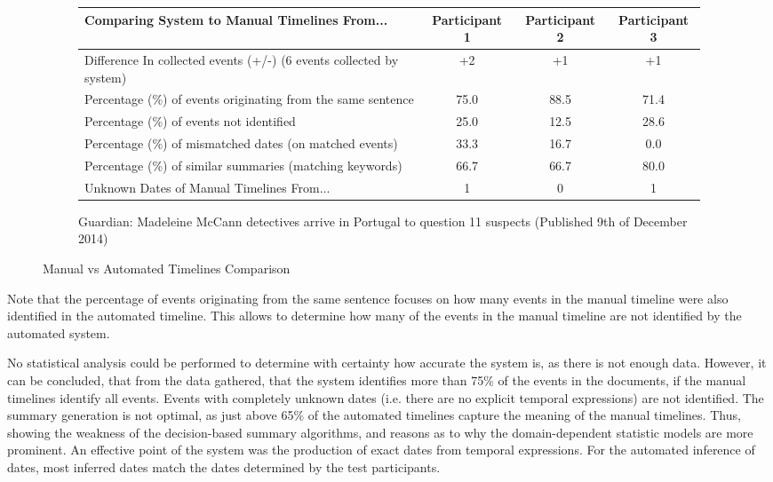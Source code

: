 \begin{figure}[h]
\begin{subfigure}{.5\textwidth}
\begin{tabular}{ |p{5cm}|c|c|c| } 
 \hline
Comparing System to Manual Timelines From... & Participant 1 & Participant 2 & Participant 3\\
\hline
\hline
Difference In collected events (+/-) (6 events collected by system) &  +2 & +1 & +1 \\
\hline
Percentage (\%) of events originating from the same sentence  & 75.0 & 88.5 & 71.4\\
\hline
Percentage (\%) of events not identified & 25.0 & 12.5 & 28.6\\
\hline
Percentage (\%) of mismatched dates (on matched events) & 33.3 & 16.7 & 0.0\\
\hline
Percentage (\%) of similar summaries (matching keywords) & 66.7 & 66.7 & 80.0\\
\hline
Unknown Dates of Manual Timelines From... & 1 & 0 & 1\\
\hline
\end{tabular}
\caption{Guardian: Madeleine McCann detectives arrive in Portugal to question 11 suspects (Published 9th of December 2014)}
\end{subfigure}

\caption{Manual vs Automated Timelines Comparison}
\label{fig:tableAnalysis}
\end{figure}

\par Note that the percentage of events originating from the same sentence focuses on how many events in the manual timeline were also identified in the automated timeline. This allows to determine how many of the events in the manual timeline are not identified by the automated system.

\par No statistical analysis could be performed to determine with certainty how accurate the system is, as there is not enough data. However, it can be concluded, that from the data gathered, that the system identifies more than 75\% of the events in the documents, if the manual timelines identify all events.  Events with completely unknown dates (i.e. there are no explicit temporal expressions) are not identified. The summary generation is not optimal, as just above 65\% of the automated timelines capture the meaning of the manual timelines. Thus, showing the weakness of the decision-based summary algorithms, and reasons as to why the domain-dependent statistic models are more prominent. An effective point of the system was the production of exact dates from temporal expressions. For the automated inference of dates, most inferred dates match the dates determined by the test participants.


